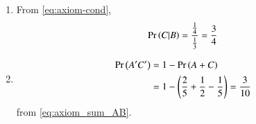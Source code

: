 \begin{enumerate}
\item 
From \eqref{eq:axiom-cond},
\begin{align}
\Pr\left(C | B\right)
=\frac{\frac{1}{4}}{\frac{1}{3}}
=\frac{3}{4}
\end{align} 
\item 
\begin{align}
\Pr\left(A^{\prime} C^{\prime}\right)
&=1-\Pr\left(A+C\right)\\
&=1-\left(\frac{2}{5}+\frac{1}{2}-\frac{1}{5}\right)
=\frac{3}{10}
\end{align}
from \eqref{eq:axiom_sum_AB}.
\end{enumerate}

